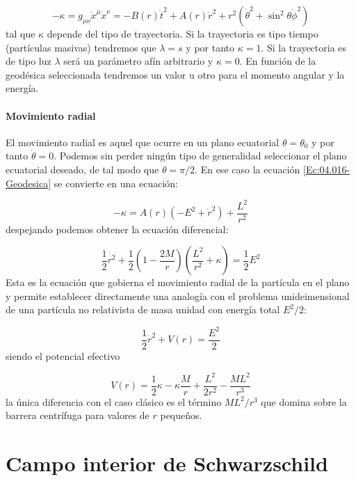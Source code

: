 \documentclass[12pt,a4paper]{book}
\numberwithin{equation}{section}
\numberwithin{figure}{section}
\newcommand{\parentesis}[1]{\left( #1  \right)}
\begin{document}
\begin{equation}
- \kappa =g_{\mu \nu } \dot{x}^\mu \dot{x}^\nu = - B(r)\dot{t}^2 + A(r) \dot{r}^2 + r^2 (\dot{\theta}^2 + \sin^2 \theta \dot{\phi}^2) \label{Ec:04.016-Geodesica}
\end{equation}
tal que $\kappa$ depende del tipo de trayectoria. Si la trayectoria es tipo tiempo (partículas masivas) tendremos que $\lambda=s$ y por tanto $\kappa=1$. Si la trayectoria es de tipo luz $\lambda$ será un parámetro afín arbitrario y $\kappa=0$. En función de la geodésica seleccionada tendremos un valor u otro para el momento angular y la energía. 

\subsubsection{Movimiento radial}

El movimiento radial es aquel que ocurre en un plano ecuatorial $\theta=\theta_0$ y por tanto $\dot{\theta}=0$. Podemos sin perder ningún tipo de generalidad seleccionar el plano ecuatorial deseado, de tal modo que $\theta =  \pi /2$. En ese caso la ecuación \ref{Ec:04.016-Geodesica} se convierte en una ecuación:

\begin{equation}
- \kappa = A(r) (-E^2+\dot{r}^2) + \frac{L^2}{r^2}
\end{equation}
despejando podemos obtener la ecuación diferencial:

\begin{equation}
\frac{1}{2} \dot{r^2} +\frac{1}{2} \parentesis{1-\frac{2M}{r}} \parentesis{\frac{L^2}{r^2}+\kappa} = \frac{1}{2} E^2
\end{equation}
Esta es la ecuación que gobierna el movimiento radial de la partícula en el plano y permite establecer directamente una analogía con el problema unideimensional de una partícula no relativista de masa unidad con energía total $E^2/2$:

\begin{equation}
\frac{1}{2} \dot{r}^2 + V(r) = \frac{E^2}{2}
\end{equation}
siendo el potencial efectivo

\begin{equation}
V(r) = \frac{1}{2} \kappa - \kappa \frac{M}{r} + \frac{L^2}{2r^2} - \frac{ML^2}{r^3}
\end{equation}
la única diferencia con el caso clásico es el término $ML^2 /r^3$ que domina sobre la barrera centrífuga para valores de $r$ pequeños. 

\newpage

\chapter{Campo interior de Schwarzschild}
\end{document}
